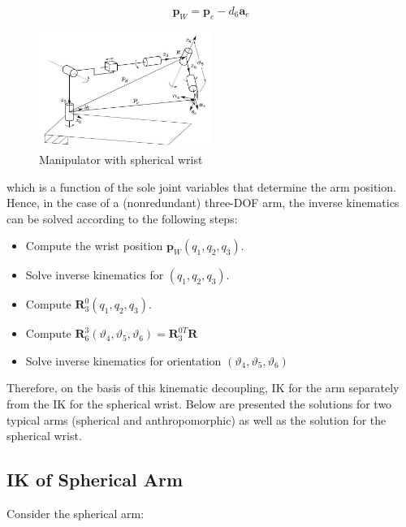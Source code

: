 \documentclass[10pt]{article}
\begin{document}
$$
\boldsymbol{p}_{W}=\boldsymbol{p}_{e}-d_{6} \boldsymbol{a}_{e}
$$

\begin{figure}[H]
    \centering
    \includegraphics[max width=0.5\textwidth]{./kinematics/analytic_ik_decouple}
    \caption{Manipulator with spherical wrist}
    \label{fig:enter-label}
\end{figure}


\noindent
which is a function of the sole joint variables that determine the arm position. Hence, in the case of a (nonredundant) three-DOF arm, the inverse kinematics can be solved according to the following steps:

\begin{itemize}
  \item Compute the wrist position $\boldsymbol{p}_{W}\left(q_{1}, q_{2}, q_{3}\right)$.

  \item Solve inverse kinematics for $\left(q_{1}, q_{2}, q_{3}\right)$.

  \item Compute $\boldsymbol{R}_{3}^{0}\left(q_{1}, q_{2}, q_{3}\right)$.

  \item Compute $\boldsymbol{R}_{6}^{3}\left(\vartheta_{4}, \vartheta_{5}, \vartheta_{6}\right)=\boldsymbol{R}_{3}^{0 T} \boldsymbol{R}$

  \item Solve inverse kinematics for orientation $\left(\vartheta_{4}, \vartheta_{5}, \vartheta_{6}\right)$

\end{itemize}

Therefore, on the basis of this kinematic decoupling, IK for the arm separately from the IK for the spherical wrist. Below are presented the solutions for two typical arms (spherical and anthropomorphic) as well as the solution for the spherical wrist.

\subsection{IK of Spherical Arm}
Consider the spherical arm:
\end{document}

